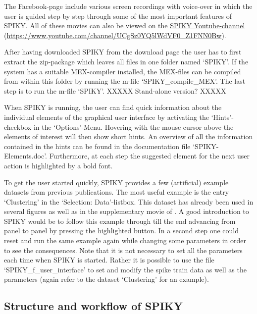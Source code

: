 \documentclass[10pt,twocolumn]{elsart5p}
\begin{document}
The Facebook-page include various screen recordings with voice-over in which the user is guided step by step through some of the most important features of SPIKY. All of these movies can also be viewed on the \href{https://www.youtube.com/channel/UCgSz0YQ5lWdVF0_Z1FNN0Bw}{SPIKY Youtube-channel} (\url{https://www.youtube.com/channel/UCgSz0YQ5lWdVF0_Z1FNN0Bw}).

After having downloaded SPIKY from the download page the user has to first extract the zip-package which leaves all files in one folder named `SPIKY'. If the system has a suitable MEX-compiler installed, the MEX-files can be compiled from within this folder by running the m-file `SPIKY\_compile\_MEX'. The last step is to run the m-file `SPIKY'. XXXXX Stand-alone version? XXXXX

When SPIKY is running, the user can find quick information about the individual elements of the graphical user interface by activating the `Hints'-checkbox in the `Options'-Menu. Hovering with the mouse cursor above the elements of interest will then show short hints. An overview of all the information contained in the hints can be found in the documentation file `SPIKY-Elements.doc'. Furthermore, at each step the suggested element for the next user action is highlighted by a bold font. 

To get the user started quickly, SPIKY provides a few (artificial) example datasets from previous publications. The most useful example is the entry `Clustering' in the `Selection: Data'-listbox. This dataset has already been used in several figures as well as in the supplementary movie of \cite{Kreuz13}. A good introduction to SPIKY would be to follow this example through till the end advancing from panel to panel by pressing the highlighted button. In a second step one could reset and run the same example again while changing some parameters in order to see the consequences. Note that it is not necessary to set all the parameters each time when SPIKY is started. Rather it is possible to use the file `SPIKY\_f\_user\_interface' to set and modify the spike train data as well as the parameters (again refer to the dataset `Clustering' for an example).


\subsection{\label{ss:Structure} Structure and workflow of SPIKY}
\end{document}
